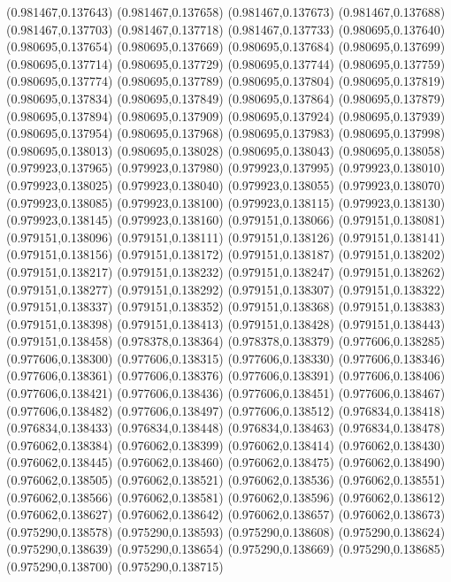 (0.981467,0.137643)
(0.981467,0.137658)
(0.981467,0.137673)
(0.981467,0.137688)
(0.981467,0.137703)
(0.981467,0.137718)
(0.981467,0.137733)
(0.980695,0.137640)
(0.980695,0.137654)
(0.980695,0.137669)
(0.980695,0.137684)
(0.980695,0.137699)
(0.980695,0.137714)
(0.980695,0.137729)
(0.980695,0.137744)
(0.980695,0.137759)
(0.980695,0.137774)
(0.980695,0.137789)
(0.980695,0.137804)
(0.980695,0.137819)
(0.980695,0.137834)
(0.980695,0.137849)
(0.980695,0.137864)
(0.980695,0.137879)
(0.980695,0.137894)
(0.980695,0.137909)
(0.980695,0.137924)
(0.980695,0.137939)
(0.980695,0.137954)
(0.980695,0.137968)
(0.980695,0.137983)
(0.980695,0.137998)
(0.980695,0.138013)
(0.980695,0.138028)
(0.980695,0.138043)
(0.980695,0.138058)
(0.979923,0.137965)
(0.979923,0.137980)
(0.979923,0.137995)
(0.979923,0.138010)
(0.979923,0.138025)
(0.979923,0.138040)
(0.979923,0.138055)
(0.979923,0.138070)
(0.979923,0.138085)
(0.979923,0.138100)
(0.979923,0.138115)
(0.979923,0.138130)
(0.979923,0.138145)
(0.979923,0.138160)
(0.979151,0.138066)
(0.979151,0.138081)
(0.979151,0.138096)
(0.979151,0.138111)
(0.979151,0.138126)
(0.979151,0.138141)
(0.979151,0.138156)
(0.979151,0.138172)
(0.979151,0.138187)
(0.979151,0.138202)
(0.979151,0.138217)
(0.979151,0.138232)
(0.979151,0.138247)
(0.979151,0.138262)
(0.979151,0.138277)
(0.979151,0.138292)
(0.979151,0.138307)
(0.979151,0.138322)
(0.979151,0.138337)
(0.979151,0.138352)
(0.979151,0.138368)
(0.979151,0.138383)
(0.979151,0.138398)
(0.979151,0.138413)
(0.979151,0.138428)
(0.979151,0.138443)
(0.979151,0.138458)
(0.978378,0.138364)
(0.978378,0.138379)
(0.977606,0.138285)
(0.977606,0.138300)
(0.977606,0.138315)
(0.977606,0.138330)
(0.977606,0.138346)
(0.977606,0.138361)
(0.977606,0.138376)
(0.977606,0.138391)
(0.977606,0.138406)
(0.977606,0.138421)
(0.977606,0.138436)
(0.977606,0.138451)
(0.977606,0.138467)
(0.977606,0.138482)
(0.977606,0.138497)
(0.977606,0.138512)
(0.976834,0.138418)
(0.976834,0.138433)
(0.976834,0.138448)
(0.976834,0.138463)
(0.976834,0.138478)
(0.976062,0.138384)
(0.976062,0.138399)
(0.976062,0.138414)
(0.976062,0.138430)
(0.976062,0.138445)
(0.976062,0.138460)
(0.976062,0.138475)
(0.976062,0.138490)
(0.976062,0.138505)
(0.976062,0.138521)
(0.976062,0.138536)
(0.976062,0.138551)
(0.976062,0.138566)
(0.976062,0.138581)
(0.976062,0.138596)
(0.976062,0.138612)
(0.976062,0.138627)
(0.976062,0.138642)
(0.976062,0.138657)
(0.976062,0.138673)
(0.975290,0.138578)
(0.975290,0.138593)
(0.975290,0.138608)
(0.975290,0.138624)
(0.975290,0.138639)
(0.975290,0.138654)
(0.975290,0.138669)
(0.975290,0.138685)
(0.975290,0.138700)
(0.975290,0.138715)
